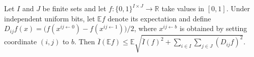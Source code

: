 \begin{lemma}
\leanok
{}
Let $I$ and $J$ be finite sets and let $f:\{0,1\}^{I\times J}\to\mathbb R$ take values
in $[0,1]$. Under independent uniform bits, let $\mathbb E f$ denote its expectation and
define $D_{ij}f(x)=\bigl(f(x^{ij\leftarrow0})-f(x^{ij\leftarrow1})\bigr)/2$, where
$x^{ij\leftarrow b}$ is obtained by setting coordinate $(i,j)$ to $b$. Then $\overline
I(\mathbb E f)\le\mathbb E\sqrt{\overline I(f)^2+\sum_{i\in I}\sum_{j\in
J}(D_{ij}f)^2}$.
\end{lemma}
